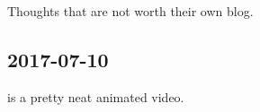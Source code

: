 \documentclass{article}
\begin{document}
Thoughts that are not worth their own blog.

\subsection{2017-07-10}
 is a pretty neat animated video.
\end{document}
